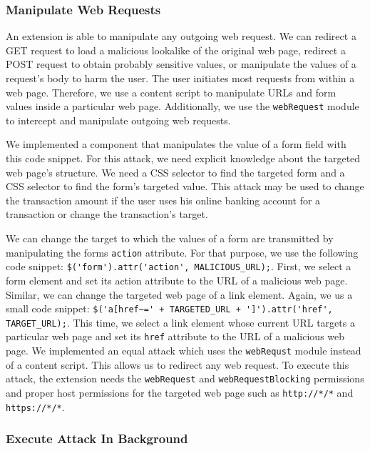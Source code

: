\subsubsection{Manipulate Web Requests}
\label{sec:manipulateWebRequests}

	An extension is able to manipulate any outgoing web request. We can redirect a GET request to load a malicious lookalike of the original web page, redirect a POST request to obtain probably sensitive values, or manipulate the values of a request's body to harm the user. The user initiates most requests from within a web page. Therefore, we use a content script to manipulate URLs and form values inside a particular web page. Additionally, we use the \texttt{webRequest} module to intercept and manipulate outgoing web requests.
	
	We implemented a component that manipulates the value of a form field with this code snippet. For this attack, we need explicit knowledge about the targeted web page's structure. We need a CSS selector to find the targeted form and a CSS selector to find the form's targeted value. This attack may be used to change the transaction amount if the user uses his online banking account for a transaction or change the transaction's target. 

	We can change the target to which the values of a form are transmitted by manipulating the forms \texttt{action} attribute. For that purpose, we use the following code snippet: \lstinline|$('form').attr('action', MALICIOUS_URL);|. First, we select a form element and set its action attribute to the URL of a malicious web page. Similar, we can change the targeted web page of a link element. Again, we us a small code snippet: \lstinline|$('a[href~=' + TARGETED_URL + ']').attr('href', TARGET_URL);|. This time, we select a link element whose current URL targets a particular web page and set its \texttt{href} attribute to the URL of a malicious web page. We implemented an equal attack which uses the \texttt{webRequst} module instead of a content script. This allows us to redirect any web request. To execute this attack, the extension needs the \texttt{webRequest} and \texttt{webRequestBlocking} permissions and proper host permissions for the targeted web page such as \texttt{http://*/*} and \texttt{https://*/*}. 
	
\subsubsection{Execute Attack In Background}
\label{sec:executeAttackInBackground}


